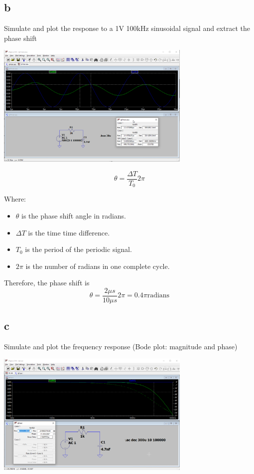 \documentclass{article}
\begin{document}
	\subsection*{b} 
	
	Simulate and plot the response to a 1V 100kHz sinusoidal signal and extract the phase shift

	
	\begin{center}
	\includegraphics[width=0.7\textwidth]{1v100k}
	\end{center}
	
	
	\[
	\theta = \frac{\Delta T}{T_0}2\pi
	\]

	Where:
	\begin{itemize}
		\item $\theta$ is the phase shift angle in radians.
		\item $\Delta T$ is the time time difference.
	   	\item $T_0$ is the period of the periodic signal.
	  	\item $2\pi$ is the number of radians in one complete cycle.
	\end{itemize}
	
	
	Therefore, the phase shift is $$\theta = \frac{2\mu s}{10\mu s}2\pi = 0.4\pi \text{radians}$$
	
	
	\subsection*{c}
	
	Simulate and plot the frequency response (Bode plot: magnitude and phase)
	
	\begin{center}
	\includegraphics[width=0.7\textwidth]{bode}
	\end{center}
	
\end{document}
